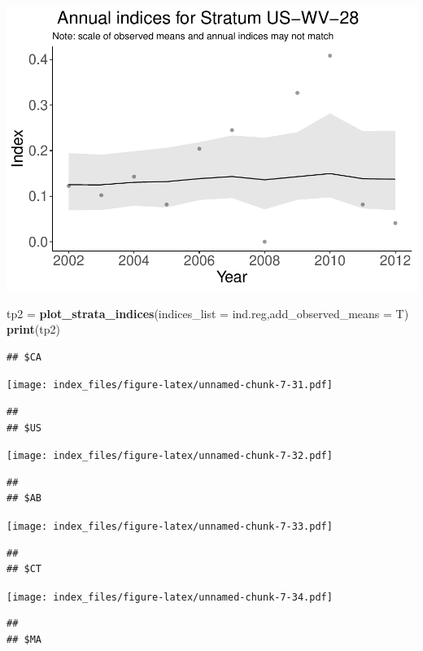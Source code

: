 \documentclass[]{article}
\newenvironment{Shaded}{\begin{snugshade}}{\end{snugshade}}
\newcommand{\KeywordTok}[1]{\textcolor[rgb]{0.13,0.29,0.53}{\textbf{#1}}}
\newcommand{\DataTypeTok}[1]{\textcolor[rgb]{0.13,0.29,0.53}{#1}}
\newcommand{\StringTok}[1]{\textcolor[rgb]{0.31,0.60,0.02}{#1}}
\newcommand{\NormalTok}[1]{#1}
\begin{document}
\includegraphics{index_files/figure-latex/unnamed-chunk-7-30.pdf}

\begin{Shaded}
\begin{Highlighting}[]
\NormalTok{tp2 =}\StringTok{ }\KeywordTok{plot_strata_indices}\NormalTok{(}\DataTypeTok{indices_list =}\NormalTok{ ind.reg,}\DataTypeTok{add_observed_means =}\NormalTok{ T)}
\KeywordTok{print}\NormalTok{(tp2)}
\end{Highlighting}
\end{Shaded}

\begin{verbatim}
## $CA
\end{verbatim}

\texttt{[image: index\_files/figure-latex/unnamed-chunk-7-31.pdf]}

\begin{verbatim}
## 
## $US
\end{verbatim}

\texttt{[image: index\_files/figure-latex/unnamed-chunk-7-32.pdf]}

\begin{verbatim}
## 
## $AB
\end{verbatim}

\texttt{[image: index\_files/figure-latex/unnamed-chunk-7-33.pdf]}

\begin{verbatim}
## 
## $CT
\end{verbatim}

\texttt{[image: index\_files/figure-latex/unnamed-chunk-7-34.pdf]}

\begin{verbatim}
## 
## $MA
\end{verbatim}
\end{document}
